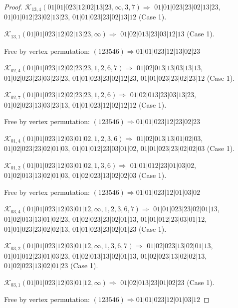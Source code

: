 \documentclass[12pt]{article}
\theoremstyle{plain}
\theoremstyle{definition}
\theoremstyle{remark}
\newcommand{\fancy}[1]{\mathcal{#1}}
\def\K{\fancy{K}}
\begin{document}
\begin{proof}
	$\K_{13,4}(01|01|023|12|02|13|23,\infty,3, 7)\Rightarrow $ $01|01|023|23|02|13|23$, $01|01|012|23|02|13|23$, $01|01|023|23|02|13|12$ (Case 1).
	
	$\K_{13,1}(01|01|023|12|02|13|23,\infty)\Rightarrow $ $01|02|013|23|03|12|13$ (Case 1).
	
	
	
	Free by vertex permutation: $(1 2 3 5 4 6)\Rightarrow 01|01|023|12|13|02|23$
	
	
	
	\bigskip
	
	$\K_{02,4}(01|01|023|12|02|23|23,1, 2, 6, 7)\Rightarrow $ $01|02|013|13|03|13|13$, $01|02|023|23|03|23|23$, $01|01|023|23|02|12|23$, $01|01|023|23|02|23|12$ (Case 1).
	
	$\K_{02,7}(01|01|023|12|02|23|23,1, 2, 6)\Rightarrow $ $01|02|013|23|03|13|23$, $01|02|023|13|03|23|13$, $01|01|023|12|02|12|12$ (Case 1).
	
	
	
	Free by vertex permutation: $(1 2 3 5 4 6)\Rightarrow 01|01|023|12|23|02|23$
	
	
	
	\bigskip
	
	$\K_{01,4}(01|01|023|12|03|01|02,1, 2, 3, 6)\Rightarrow $ $01|02|013|13|01|02|03$, $01|02|023|23|02|01|03$, $01|01|012|23|03|01|02$, $01|01|023|23|02|02|03$ (Case 1).
	
	$\K_{01,2}(01|01|023|12|03|01|02,1, 3, 6)\Rightarrow $ $01|01|012|23|01|03|02$, $01|02|013|13|02|01|03$, $01|02|023|13|02|02|03$ (Case 1).
	
	
	
	Free by vertex permutation: $(1 2 3 5 4 6)\Rightarrow 01|01|023|12|01|03|02$
	
	
	
	\bigskip
	
	$\K_{03,4}(01|01|023|12|03|01|12,\infty,1, 2, 3, 6, 7)\Rightarrow $ $01|01|023|23|02|01|13$, $01|02|013|13|01|02|23$, $01|02|023|23|02|01|13$, $01|01|012|23|03|01|12$, $01|01|023|23|02|02|13$, $01|01|023|23|02|01|23$ (Case 1).
	
	$\K_{03,2}(01|01|023|12|03|01|12,\infty,1, 3, 6, 7)\Rightarrow $ $01|02|023|13|02|01|13$, $01|01|012|23|01|03|23$, $01|02|013|13|02|01|13$, $01|02|023|13|02|02|13$, $01|02|023|13|02|01|23$ (Case 1).
	
	$\K_{03,1}(01|01|023|12|03|01|12,\infty)\Rightarrow $ $01|02|013|23|01|02|23$ (Case 1).
	
	
	
	Free by vertex permutation: $(1 2 3 5 4 6)\Rightarrow 01|01|023|12|01|03|12$
	

\end{proof}
\end{document}
